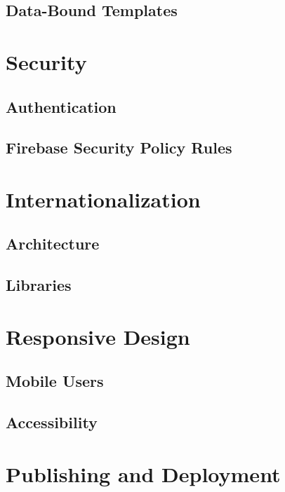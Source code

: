\subsection{Data-Bound Templates}

\section{Security}
\label{sec:security}

\subsection{Authentication}

\subsection{Firebase Security Policy Rules}
\label{sec:fbsecurity}

\section{Internationalization}
\label{sec:i18n}

\subsection{Architecture}
\subsection{Libraries}

\section{Responsive Design}
\label{sec:responsive}

\subsection{Mobile Users}

\subsection{Accessibility}

\section{Publishing and Deployment}
\label{publishing}
